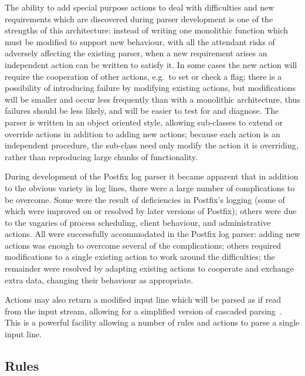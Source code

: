 \documentclass[draft]{svmult}
\begin{document}
The ability to add special purpose actions to deal with difficulties and
new requirements which are discovered during parser development is one of
the strengths of this architecture: instead of writing one monolithic
function which must be modified to support new behaviour, with all the
attendant risks of adversely affecting the existing parser, when a new
requirement arises an independent action can be written to satisfy it.  In
some cases the new action will require the cooperation of other actions,
e.g.\ to set or check a flag; there is a possibility of introducing failure
by modifying existing actions, but modifications will be smaller and occur
less frequently than with a monolithic architecture, thus failures should
be less likely, and will be easier to test for and diagnose.  The parser is
written in an object oriented style, allowing sub-classes to extend or
override actions in addition to adding new actions; because each action is
an independent procedure, the sub-class need only modify the action it is
overriding, rather than reproducing large chunks of functionality.

During development of the Postfix log parser it became apparent that in
addition to the obvious variety in log lines, there were a large number of
complications to be overcome.  Some were the result of deficiencies in
Postfix's logging (some of which were improved on or resolved by later
versions of Postfix); others were due to the vagaries of process
scheduling, client behaviour, and administrative actions.  All were
successfully accommodated in the Postfix log parser: adding new actions was
enough to overcome several of the complications; others required
modifications to a single existing action to work around the difficulties;
the remainder were resolved by adapting existing actions to cooperate and
exchange extra data, changing their behaviour as appropriate.

Actions may also return a modified input line which will be parsed as if
read from the input stream, allowing for a simplified version of cascaded
parsing~\cite{cascaded-parsing}.  This is a powerful facility allowing a
number of rules and actions to parse a single input line.

\subsection{Rules}

\label{Rules}
\end{document}

